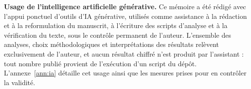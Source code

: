 %
%
\bigskip
\noindent\textbf{Usage de l'intelligence artificielle générative.} Ce mémoire a été rédigé avec
l'appui ponctuel d'outils d'IA générative, utilisés comme assistance à la rédaction et à la reformulation du
manuscrit, à l'écriture des scripts d'analyse et à la vérification du texte, sous le contrôle
permanent de l'auteur. L'ensemble des analyses, choix méthodologiques et interprétations des
résultats relèvent exclusivement de l'auteur, et aucun résultat chiffré n'est produit par
l'assistant : tout nombre publié provient de l'exécution d'un script du dépôt. L'annexe~\ref{ann:ia}
détaille cet usage ainsi que les mesures prises pour en contrôler la validité.

\setcounter{tocdepth}{1}
\tableofcontents


